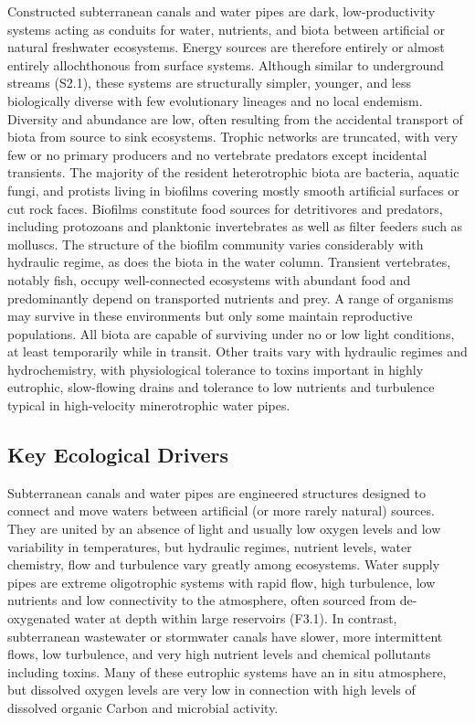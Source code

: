 \documentclass[
  letterpaper,
  DIV=11,
  numbers=noendperiod]{scrartcl}
\begin{document}
Constructed subterranean canals and water pipes are dark,
low-productivity systems acting as conduits for water, nutrients, and
biota between artificial or natural freshwater ecosystems. Energy
sources are therefore entirely or almost entirely allochthonous from
surface systems. Although similar to underground streams (S2.1), these
systems are structurally simpler, younger, and less biologically diverse
with few evolutionary lineages and no local endemism. Diversity and
abundance are low, often resulting from the accidental transport of
biota from source to sink ecosystems. Trophic networks are truncated,
with very few or no primary producers and no vertebrate predators except
incidental transients. The majority of the resident heterotrophic biota
are bacteria, aquatic fungi, and protists living in biofilms covering
mostly smooth artificial surfaces or cut rock faces. Biofilms constitute
food sources for detritivores and predators, including protozoans and
planktonic invertebrates as well as filter feeders such as molluscs. The
structure of the biofilm community varies considerably with hydraulic
regime, as does the biota in the water column. Transient vertebrates,
notably fish, occupy well-connected ecosystems with abundant food and
predominantly depend on transported nutrients and prey. A range of
organisms may survive in these environments but only some maintain
reproductive populations. All biota are capable of surviving under no or
low light conditions, at least temporarily while in transit. Other
traits vary with hydraulic regimes and hydrochemistry, with
physiological tolerance to toxins important in highly eutrophic,
slow-flowing drains and tolerance to low nutrients and turbulence
typical in high-velocity minerotrophic water pipes.

\subsection{Key Ecological Drivers}\label{key-ecological-drivers-64}

Subterranean canals and water pipes are engineered structures designed
to connect and move waters between artificial (or more rarely natural)
sources. They are united by an absence of light and usually low oxygen
levels and low variability in temperatures, but hydraulic regimes,
nutrient levels, water chemistry, flow and turbulence vary greatly among
ecosystems. Water supply pipes are extreme oligotrophic systems with
rapid flow, high turbulence, low nutrients and low connectivity to the
atmosphere, often sourced from de-oxygenated water at depth within large
reservoirs (F3.1). In contrast, subterranean wastewater or stormwater
canals have slower, more intermittent flows, low turbulence, and very
high nutrient levels and chemical pollutants including toxins. Many of
these eutrophic systems have an in situ atmosphere, but dissolved oxygen
levels are very low in connection with high levels of dissolved organic
Carbon and microbial activity.
\end{document}

